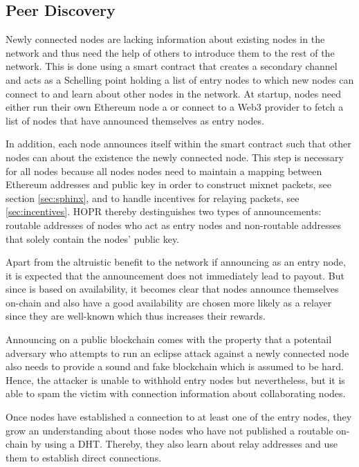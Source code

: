 \subsection{Peer Discovery}
\label{sec:p2p:peer-discovery}

Newly connected nodes are lacking information about existing nodes in the network and thus need the help of others to introduce them to the rest of the network. This is done using a smart contract that creates a secondary channel and acts as a Schelling point holding a list of entry nodes to which new nodes can connect to and learn about other nodes in the network. At startup, nodes need either run their own Ethereum node a or connect to a Web3 provider to fetch a list of nodes that have announced themselves as entry nodes.

In addition, each node announces itself within the smart contract such that other nodes can about the existence the newly connected node. This step is necessary for all nodes because all nodes nodes need to maintain a mapping between Ethereum addresses and public key in order to construct mixnet packets, see section \ref{sec:sphinx}, and to handle incentives for relaying packets, see \ref{sec:incentives}. HOPR thereby destinguishes two types of announcements: routable addresses of nodes who act as entry nodes and non-routable addresses that solely contain the nodes' public key.

Apart from the altruistic benefit to the network if announcing as an entry node, it is expected that the announcement does not immediately lead to payout. But since  is based on availability, it becomes clear that nodes announce themselves on-chain and also have a good availability are chosen more likely as a relayer since they are well-known which thus increases their rewards.

Announcing on a public blockchain comes with the property that a potentail adversary who attempts to run an eclipse attack against a newly connected node also needs to provide a sound and fake blockchain which is assumed to be hard. Hence, the attacker is unable to withhold entry nodes but nevertheless, but it is able to spam the victim with connection information about collaborating nodes.

Once nodes have established a connection to at least one of the entry nodes, they grow an understanding about those nodes who have not published a routable on-chain by using a DHT. Thereby, they also learn about relay addresses and use them to establish direct connections.